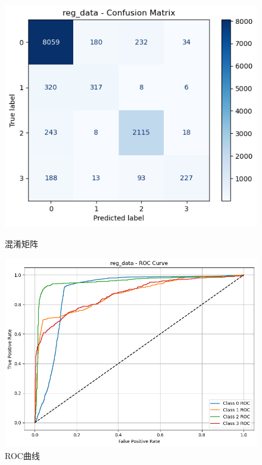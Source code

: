 \documentclass[10pt]{article}
\begin{document}
\begin{figure}[H]
\centering
\begin{minipage}[t]{0.45\textwidth}
  \centering
  \includegraphics[width=\linewidth]{cls_svm_lda1.png}
  \caption{混淆矩阵}
  \label{fig:71}
\end{minipage}
\hfill
\begin{minipage}[t]{0.52\textwidth}
  \centering
  \includegraphics[width=\linewidth]{cls_svm_lda2.png}
  \caption{ROC曲线}
  \label{fig:72}
\end{minipage}
\end{figure}
\end{document}
